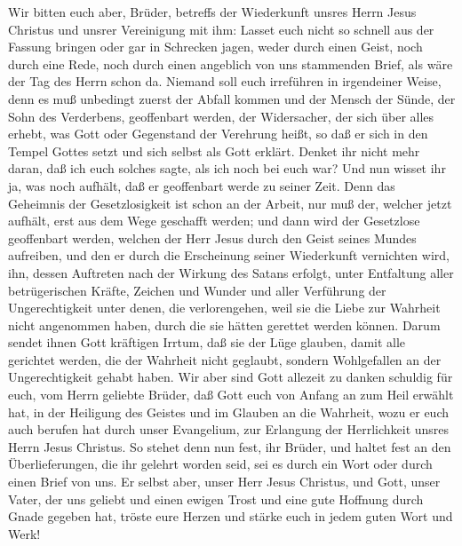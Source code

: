  Wir bitten euch aber, Brüder, betreffs der Wiederkunft
unsres Herrn Jesus Christus und unsrer Vereinigung mit ihm:
 Lasset euch nicht so schnell aus der Fassung bringen oder
gar in Schrecken jagen, weder durch einen Geist, noch durch eine Rede,
noch durch einen angeblich von uns stammenden Brief, als wäre der Tag
des Herrn schon da.  Niemand soll euch irreführen in
irgendeiner Weise, denn es muß unbedingt zuerst der Abfall kommen und
der Mensch der Sünde, der Sohn des Verderbens, 
geoffenbart werden, der Widersacher, der sich über alles erhebt, was
Gott oder Gegenstand der Verehrung heißt, so daß er sich in den Tempel
Gottes setzt und sich selbst als Gott erklärt.  Denket ihr
nicht mehr daran, daß ich euch solches sagte, als ich noch bei euch war?
 Und nun wisset ihr ja, was noch aufhält, daß er
geoffenbart werde zu seiner Zeit.  Denn das Geheimnis der
Gesetzlosigkeit ist schon an der Arbeit, nur muß der, welcher jetzt
aufhält, erst aus dem Wege geschafft werden;  und dann
wird der Gesetzlose geoffenbart werden, welchen der Herr Jesus durch den
Geist seines Mundes aufreiben, und den er durch die Erscheinung seiner
Wiederkunft vernichten wird,  ihn, dessen Auftreten nach
der Wirkung des Satans erfolgt, unter Entfaltung aller betrügerischen
Kräfte, Zeichen und Wunder  und aller Verführung der
Ungerechtigkeit unter denen, die verlorengehen, weil sie die Liebe zur
Wahrheit nicht angenommen haben, durch die sie hätten gerettet werden
können.  Darum sendet ihnen Gott kräftigen Irrtum, daß
sie der Lüge glauben,  damit alle gerichtet werden, die
der Wahrheit nicht geglaubt, sondern Wohlgefallen an der Ungerechtigkeit
gehabt haben.  Wir aber sind Gott allezeit zu danken
schuldig für euch, vom Herrn geliebte Brüder, daß Gott euch von Anfang
an zum Heil erwählt hat, in der Heiligung des Geistes und im Glauben an
die Wahrheit,  wozu er euch auch berufen hat durch unser
Evangelium, zur Erlangung der Herrlichkeit unsres Herrn Jesus Christus.
 So stehet denn nun fest, ihr Brüder, und haltet fest an
den Überlieferungen, die ihr gelehrt worden seid, sei es durch ein Wort
oder durch einen Brief von uns.  Er selbst aber, unser
Herr Jesus Christus, und Gott, unser Vater, der uns geliebt und einen
ewigen Trost und eine gute Hoffnung durch Gnade gegeben hat,
 tröste eure Herzen und stärke euch in jedem guten Wort
und Werk!

